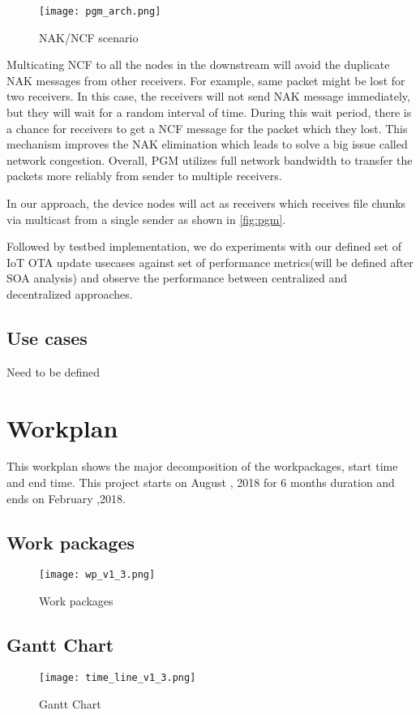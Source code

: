 \documentclass[12pt]{article}
\begin{document}
\begin{figure}[h!]
	\texttt{[image: pgm\_arch.png]}
	\caption{ NAK/NCF scenario \cite{Gemmell20021P}}
	\label{fig:pgm}
\end{figure}
\newpage

Multicating NCF to all the nodes in the downstream will avoid the duplicate NAK messages from other receivers. For example, same packet might be lost for two receivers. In this case, the receivers will not send NAK message immediately, but they will wait for a random interval of time. During this wait period, there is a chance for receivers to get a NCF message for the packet which they lost. This mechanism improves the NAK elimination which leads to solve a big issue called network congestion. Overall, PGM utilizes full network bandwidth to transfer the packets more reliably from sender to multiple receivers.

In our approach, the device nodes will act as receivers which receives file chunks via multicast from a single sender as shown in \autoref{fig:pgm}.
 
\noindent Followed by testbed implementation, we do experiments with our defined set of IoT OTA update usecases against set of performance metrics(will be defined after SOA analysis) and observe the performance between centralized and decentralized approaches.

\subsection{Use cases}
Need to be defined

\section{Workplan}
This workplan shows the major decomposition of the workpackages, start time and end time. This project starts on August , 2018 for 6 months duration and ends on February ,2018.
\newpage
\subsection{Work packages}
\begin{figure}[h!]
  \texttt{[image: wp\_v1\_3.png]}
  \caption{Work packages}
  \label{fig:work_packages}
\end{figure}
\newpage

\begin{landscape}
	\subsection{Gantt Chart}
	\begin{figure}[h!]
	  \texttt{[image: time\_line\_v1\_3.png]}
	  \caption{Gantt Chart}
	  \label{fig:gantt_chart}
	\end{figure}
\end{landscape}
\end{document}
